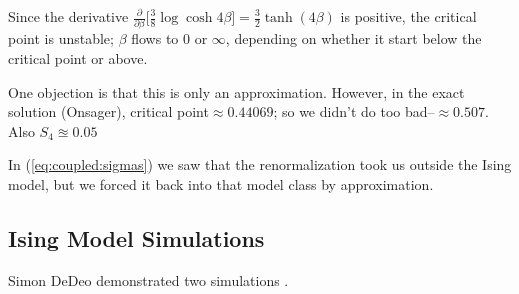 \documentclass[]{article}
\begin{document}
Since the derivative  $\frac{\partial}{\partial \beta}\big[\frac{3}{8} \log{\cosh{4\beta}}\big]=\frac{3}{2} \tanh(4\beta)$ is positive, the critical point is unstable; $\beta$ flows to $0$ or $\infty$, depending on whether it start below the critical point or above.

One objection is that this is only an approximation. However, in the exact solution (Onsager), critical point$\approx0.44069$; so we didn't do too bad--$\approx0.507$. Also $S_4\approxeq0.05$

In (\ref{eq:coupled:sigmas}) we saw that the renormalization took us outside the Ising model, but we forced it back into that model class by approximation.

\subsection{Ising Model Simulations}

Simon DeDeo demonstrated two simulations \cite{nottelmann2000ising,ashton2012renormalization}.
\end{document}
